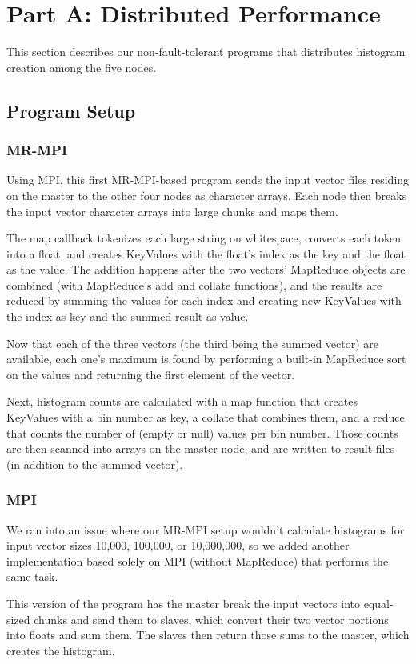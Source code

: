 \documentclass{acm_proc_article-sp}
\begin{document}
\section{Part A: Distributed Performance}
This section describes our non-fault-tolerant programs that distributes histogram creation among the five nodes.

\subsection{Program Setup}
\subsubsection{MR-MPI}
Using MPI, this first MR-MPI-based program sends the input vector files residing on the master to the other four nodes as character arrays. Each node then breaks the input vector character arrays into large chunks and maps them.

The map callback tokenizes each large string on whitespace, converts each token into a float, and creates KeyValues with the float's index as the key and the float as the value. The addition happens after the two vectors' MapReduce objects are combined (with MapReduce's add and collate functions), and the results are reduced by summing the values for each index and creating new KeyValues with the index as key and the summed result as value.

Now that each of the three vectors (the third being the summed vector) are available, each one's maximum is found by performing a built-in MapReduce sort on the values and returning the first element of the vector.

Next, histogram counts are calculated with a map function that creates KeyValues with a bin number as key, a collate that combines them, and a reduce that counts the number of (empty or null) values per bin number. Those counts are then scanned into arrays on the master node, and are written to result files (in addition to the summed vector).

\subsubsection{MPI}
We ran into an issue where our MR-MPI setup wouldn't calculate histograms for input vector sizes 10,000, 100,000, or 10,000,000, so we added another implementation based solely on MPI (without MapReduce) that performs the same task.

This version of the program has the master break the input vectors into equal-sized chunks and send them to slaves, which convert their two vector portions into floats and sum them. The slaves then return those sums to the master, which creates the histogram.
\end{document}
